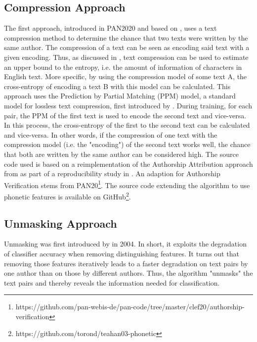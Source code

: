 \subsection{Compression Approach}
The first approach, introduced in PAN2020 and based on \cite{teahan2003compression}, uses a text compression method to determine the chance that two texts were written by the same author.
The compression of a text can be seen as encoding said text with a given encoding.
Thus, as discussed in \cite{brown1992upperBoundEntropy}, text compression can be used to estimate an upper bound to the entropy, i.e. the amount of information of characters in English text.
More specific, by using the compression model of some text A, the cross-entropy of encoding a text B with this model can be calculated.
This approach uses the Prediction by Partial Matching (PPM) model, a standard model for lossless text compression, first introduced by \cite{cleary1984PPM}.
During training, for each pair, the PPM of the first text is used to encode the second text and vice-versa.
In this process, the cross-entropy of the first to the second text can be calculated and vice-versa.
In other words, if the compression of one text with the compression model (i.e. the "encoding") of the second text works well, the chance that both are written by the same author can be considered high.
The source code used is based on a reimplementation of the Authorship Attribution approach from \cite{teahan2003compression} as part of a reproducibility study in \cite{potthast2016reimplementation}.
An adaption for Authorship Verification stems from PAN20\footnote{https://github.com/pan-webis-de/pan-code/tree/master/clef20/authorship-verification}.
The source code extending the algorithm to use phonetic features is available on GitHub\footnote{https://github.com/torond/teahan03-phonetic}.

\subsection{Unmasking Approach}
Unmasking was first introduced by \cite{koppel2004unmasking} in 2004.
In short, it exploits the degradation of classifier accuracy when removing distinguishing features.
It turns out that removing those features iteratively leads to a faster degradation on text pairs by one author than on those by different authors.
Thus, the algorithm "unmasks" the text pairs and thereby reveals the information needed for classification.\\

